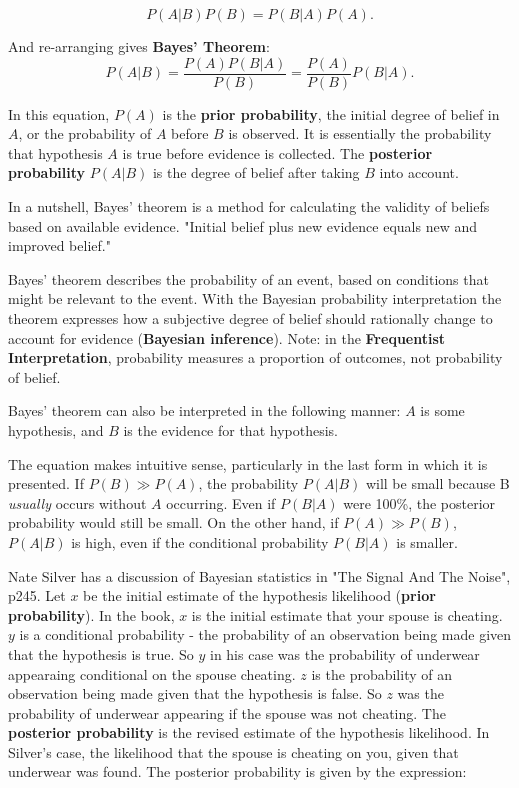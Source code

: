 \begin{equation}
P(A|B)P(B) = P(B|A)P(A).
\end{equation}

And re-arranging gives \textbf{Bayes' Theorem}:
\begin{equation}
P(A|B) = \frac{P(A)P(B|A)}{P(B)} = \frac{P(A)}{P(B)} P(B|A).
\label{equation:simpleBayes}
\end{equation}

In this equation, $P(A)$ is the \textbf{prior probability}, the initial degree of belief in $A$, or the probability of $A$ before $B$ is observed. It is essentially the probability that hypothesis $A$ is true before evidence is collected. The \textbf{posterior probability} $P(A|B)$ is the degree of belief after taking $B$ into account. 

In a nutshell, Bayes' theorem is a method for calculating the validity of beliefs based on available evidence. "Initial belief plus new evidence equals new and improved belief."

Bayes' theorem describes the probability of an event, based on conditions that might be relevant to the event. With the Bayesian probability interpretation the theorem expresses how a subjective degree of belief should rationally change to account for evidence (\textbf{Bayesian inference}). Note: in the \textbf{Frequentist Interpretation}, probability measures a proportion of outcomes, not probability of belief. 

Bayes' theorem can also be interpreted in the following manner: $A$ is some hypothesis, and $B$ is the evidence for that hypothesis. 

The equation makes intuitive sense, particularly in the last form in which it is presented. If $P(B) \gg P(A)$,  the probability $P(A|B)$ will be small because B \textit{usually} occurs without $A$ occurring. Even if $P(B|A)$ were 100\%, the posterior probability would still be small. On the other hand, if $P(A) \gg P(B)$, $P(A|B)$ is high, even if the conditional probability $P(B|A)$ is smaller. 

Nate Silver has a discussion of Bayesian statistics in "The Signal And The Noise", p245. Let $x$ be the initial estimate of the hypothesis likelihood (\textbf{prior probability}). In the book, $x$ is the initial estimate that your spouse is cheating. $y$ is a conditional probability - the probability of an observation being made given that the hypothesis is true. So $y$ in his case was the probability of underwear appearaing conditional on the spouse cheating. $z$ is the probability of an observation being made given that the hypothesis is false. So $z$ was the probability of underwear appearing if the spouse was not cheating. The \textbf{posterior probability} is the revised estimate of the hypothesis likelihood. In Silver's case, the likelihood that the spouse is cheating on you, given that underwear was found. The posterior probability is given by the expression:

